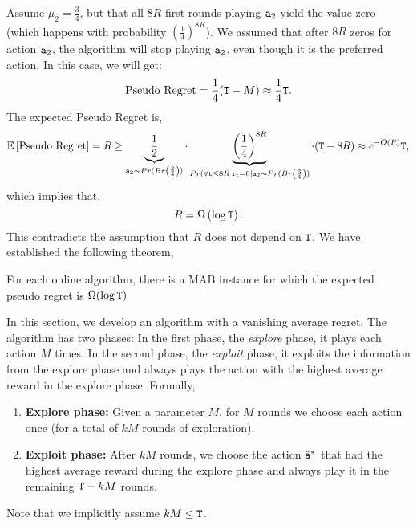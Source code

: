 Assume $\mu_2 = \frac{3}{4}$, but that all $8R$ first rounds playing
${\tt a}_2$ yield the value zero (which happens with probability
$\left(\frac{1}{4}\right)^{8R}$). We assumed that after $8R$ zeros for action ${\tt a}_2$, the algorithm will stop playing ${\tt a}_2$, even though
it is the preferred action. In this case, we will get:
\[
\text{Pseudo Regret} = \frac{1}{4} ({\tt T} - M) \approx \frac{1}{4}{\tt T}.
\]
The expected Pseudo Regret is,
\[
\mathbb{E}\left[\text{Pseudo Regret}\right] = R \geq
\underbrace{\frac{1}{2}}_{{\tt a}_{2}\sim Pr(Br\left(\frac{3}{4}\right))}
\cdot \underbrace{\left(\frac{1}{4}\right)^{8R}}_{Pr(\forall {\tt t}\leq 8R \; {\tt r}_{\tt t}= 0 |
{\tt a}_{2}\sim Pr(Br\left(\frac{3}{4}\right))} \cdot ({\tt T} - 8R) \approx
e^{-O(R)}{\tt T},
\]
which implies that,
\[
R=\Omega\left(\log {\tt T}\right).
\]
This contradicts the assumption that $R$ does not depend on ${\tt T}$.
%
We have established the following theorem,
\begin{theorem}
   For each online algorithm, there is a MAB instance for which the expected pseudo regret is $\Omega 
(\log {\tt T})$
\end{theorem}


In this section, we develop an algorithm with a vanishing average regret. The algorithm  has two phases: In the first phase, the \emph{explore}  phase, it  plays each action  $M$ times. In the second phase, the \emph{exploit} phase,
it  exploits the information from the explore phase and  always plays  the action with the highest average reward in the explore phase. Formally,

\begin{enumerate}
%
\item \textbf{Explore phase:} Given a parameter $M$,
%
for $M$ rounds we choose each action once (for a total of $kM$ rounds of exploration).
%
\item \textbf{Exploit phase:} After $kM$ rounds, we  choose the action $\hat{{\tt a}}^*$ that had the highest
average reward during the explore phase and always play it in the remaining ${\tt T}-kM$ rounds.
\end{enumerate}
Note that we implicitly assume $k M \leq {\tt T}$. 

